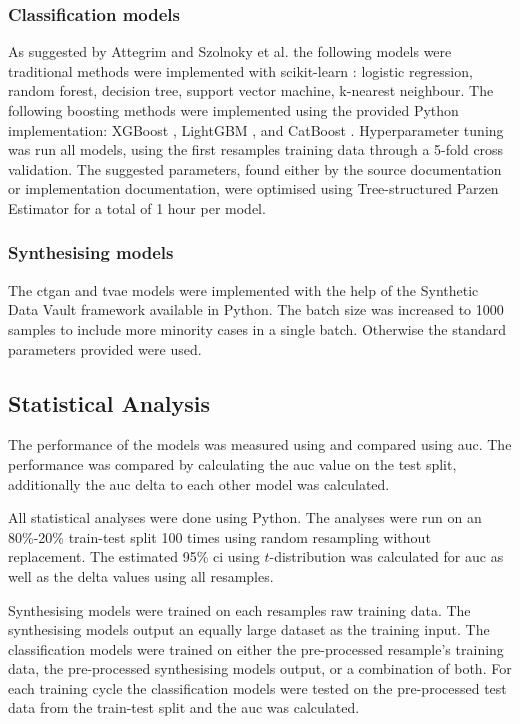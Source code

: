 \documentclass[12pt, letterpaper]{article}
\begin{document}
\subsubsection*{Classification models}
As suggested by Attegrim and Szolnoky et al. the following models were traditional methods were implemented with scikit-learn \cite{pedregosa_scikit_2011}: logistic regression, random forest, decision tree, support vector machine, k-nearest neighbour. The following boosting methods were implemented using the provided Python implementation: XGBoost \cite{chen_xgboost_2016}, LightGBM \cite{ke_lightgbm_2017}, and CatBoost \cite{prokhorenkova_catboost_2018}. Hyperparameter tuning was run all models, using the first resamples training data through a 5-fold cross validation. The suggested parameters, found either by the source documentation or implementation documentation, were optimised using Tree-structured Parzen Estimator \cite{bergstra_algorithms_2011} for a total of 1 hour per model.

\subsubsection*{Synthesising models}
The \acrfull{ctgan} \cite{xu_modeling_2019} and \acrfull{tvae} \cite{ishfaq_tvae_2018} models were implemented with the help of the Synthetic Data Vault framework \cite{patki_sdv_2016} available in Python. The batch size was increased to 1000 samples to include more minority cases in a single batch. Otherwise the standard parameters provided were used.

\subsection{Statistical Analysis}
The performance of the models was measured using and compared using \acrfull{auc}. The performance was compared by calculating the \acrshort{auc} value on the test split, additionally the \acrshort{auc} delta to each other model was calculated.

All statistical analyses were done using Python. The analyses were run on an 80\%-20\% train-test split 100 times using random resampling without replacement. The estimated 95\% \acrfull{ci} using $t$-distribution was calculated for \acrshort{auc} as well as the delta values using all resamples.

Synthesising models were trained on each resamples raw training data. The synthesising models output an equally large dataset as the training input. The classification models were trained on either the pre-processed resample's training data, the pre-processed synthesising models output, or a combination of both. For each training cycle the classification models were tested on the pre-processed test data from the train-test split and the \acrshort{auc} was calculated.
\end{document}
